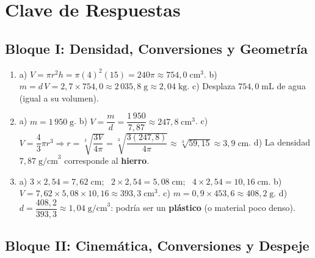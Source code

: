 \documentclass[12pt, letterpaper]{article}
\begin{document}
\newpage

\ifmwclaves
  \section{Clave de Respuestas}

  \subsection*{Bloque I: Densidad, Conversiones y Geometría}

  \begin{enumerate}[leftmargin=*, label=\textbf{\arabic*.}]
    \item a) $V = \pi r^2 h = \pi(4)^2(15) = 240\pi \approx 754{,}0\;\text{cm}^3$.
          \quad b) $m = d\,V = 2{,}7 \times 754{,}0 \approx 2\,035{,}8\;\text{g} \approx 2{,}04\;\text{kg}$.
          \quad c) Desplaza $754{,}0\;\text{mL}$ de agua (igual a su volumen).

    \item a) $m = 1\,950\;\text{g}$.
          \quad b) $V = \dfrac{m}{d} = \dfrac{1\,950}{7{,}87} \approx 247{,}8\;\text{cm}^3$.
          \quad c) $V = \dfrac{4}{3}\pi r^3 \Rightarrow r = \sqrt[3]{\dfrac{3V}{4\pi}} = \sqrt[3]{\dfrac{3(247{,}8)}{4\pi}} \approx \sqrt[3]{59{,}15} \approx 3{,}9\;\text{cm}$.
          \quad d) La densidad $7{,}87\;\text{g/cm}^3$ corresponde al \textbf{hierro}.

    \item a) $3 \times 2{,}54 = 7{,}62\;\text{cm}$; \ $2 \times 2{,}54 = 5{,}08\;\text{cm}$; \ $4 \times 2{,}54 = 10{,}16\;\text{cm}$.
          \quad b) $V = 7{,}62 \times 5{,}08 \times 10{,}16 \approx 393{,}3\;\text{cm}^3$.
          \quad c) $m = 0{,}9 \times 453{,}6 \approx 408{,}2\;\text{g}$.
          \quad d) $d = \dfrac{408{,}2}{393{,}3} \approx 1{,}04\;\text{g/cm}^3$: podría ser un \textbf{plástico} (o material poco denso).
  \end{enumerate}

  \newpage

  \subsection*{Bloque II: Cinemática, Conversiones y Despeje}
\end{document}
